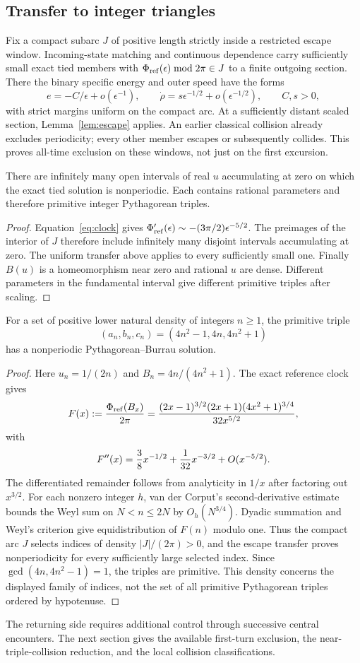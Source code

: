 \subsection{Transfer to integer triangles}

Fix a compact subarc $J$ of positive length strictly inside a restricted escape window.
Incoming-state matching and continuous dependence carry sufficiently
small exact tied members with $\Phi_{\rm ref}(\epsilon)\bmod2\pi\in J$
to a finite outgoing section. There the binary specific energy and outer
speed have the forms
\[
 e=-C/\epsilon+o(\epsilon^{-1}),\qquad
 \dot\rho=s\epsilon^{-1/2}+o(\epsilon^{-1/2}),\qquad C,s>0,
\]
with strict margins uniform on the compact arc. At a sufficiently distant
scaled section, Lemma~\ref{lem:escape} applies. An earlier classical
collision already excludes periodicity; every other member escapes or
subsequently collides. This proves all-time exclusion on these windows,
not just on the first excursion.

\begin{theorem}
There are infinitely many open intervals of real $u$ accumulating at zero
on which the exact tied solution is nonperiodic. Each contains rational
parameters and therefore primitive integer Pythagorean triples.
\end{theorem}
\begin{proof}
Equation~\eqref{eq:clock} gives
$\Phi_{\rm ref}'(\epsilon)\sim-(3\pi/2)\epsilon^{-5/2}$.
The preimages of the interior of $J$ therefore include infinitely many
disjoint intervals accumulating at zero. The uniform transfer above applies
to every sufficiently small one. Finally $B(u)$ is a homeomorphism near
zero and rational $u$ are dense. Different parameters in the fundamental
interval give different primitive triples after scaling.
\end{proof}

\begin{theorem}
For a set of positive lower natural density of integers $n\ge1$, the
primitive triple
\[
 (a_n,b_n,c_n)=(4n^2-1,4n,4n^2+1)
\]
has a nonperiodic Pythagorean--Burrau solution.
\end{theorem}
\begin{proof}
Here $u_n=1/(2n)$ and $B_n=4n/(4n^2+1)$. The exact reference clock gives
\[
 F(x):={\Phi_{\rm ref}(B_x)\over2\pi}
 ={(2x-1)^{3/2}(2x+1)(4x^2+1)^{3/4}\over32x^{5/2}},
\]
with
\[
 F''(x)={3\over8}x^{-1/2}+{1\over32}x^{-3/2}+O(x^{-5/2}).
\]
The differentiated remainder follows from analyticity in $1/x$ after
factoring out $x^{3/2}$. For each nonzero integer $h$, van der Corput's
second-derivative estimate bounds the Weyl sum on $N<n\le2N$ by
$O_h(N^{3/4})$. Dyadic summation and Weyl's criterion give equidistribution
of $F(n)$ modulo one. Thus the compact arc $J$ selects indices of density
$|J|/(2\pi)>0$, and the escape transfer proves nonperiodicity for every
sufficiently large selected index. Since $\gcd(4n,4n^2-1)=1$, the triples
are primitive. This density concerns the displayed family of indices,
not the set of all primitive Pythagorean triples ordered by hypotenuse.
\end{proof}

The returning side requires additional control through successive central
encounters. The next section gives the available first-turn exclusion,
the near-triple-collision reduction, and the local collision classifications.
